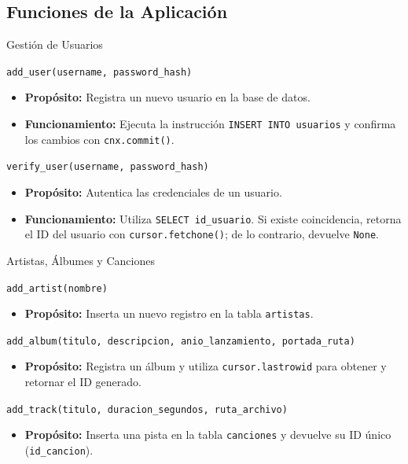 \documentclass[aspectratio=169, 10pt]{beamer}
\begin{document}
\subsection{Funciones de la Aplicación}

\begin{frame}[t]{Gestión de Usuarios}
	\small
	\begin{block}{\texttt{add\_user(username, password\_hash)}}
		\begin{itemize}
			\item \textbf{Propósito:} Registra un nuevo usuario en la base de datos.
			\item \textbf{Funcionamiento:} Ejecuta la instrucción \texttt{INSERT INTO usuarios} y confirma los cambios con \texttt{cnx.commit()}.
		\end{itemize}
	\end{block}
	
	\begin{block}{\texttt{verify\_user(username, password\_hash)}}
		\begin{itemize}
			\item \textbf{Propósito:} Autentica las credenciales de un usuario.
			\item \textbf{Funcionamiento:} Utiliza \texttt{SELECT id\_usuario}. Si existe coincidencia, retorna el ID del usuario con \texttt{cursor.fetchone()}; de lo contrario, devuelve \texttt{None}.
		\end{itemize}
	\end{block}
\end{frame}

\begin{frame}[t]{Artistas, Álbumes y Canciones}
	\small
	\begin{block}{\texttt{add\_artist(nombre)}}
		\begin{itemize}
			\item \textbf{Propósito:} Inserta un nuevo registro en la tabla \texttt{artistas}.
		\end{itemize}
	\end{block}
	
	\begin{block}{\texttt{add\_album(titulo, descripcion, anio\_lanzamiento, portada\_ruta)}}
		\begin{itemize}
			\item \textbf{Propósito:} Registra un álbum y utiliza \texttt{cursor.lastrowid} para obtener y retornar el ID generado.
		\end{itemize}
	\end{block}
	
	\begin{block}{\texttt{add\_track(titulo, duracion\_segundos, ruta\_archivo)}}
		\begin{itemize}
			\item \textbf{Propósito:} Inserta una pista en la tabla \texttt{canciones} y devuelve su ID único (\texttt{id\_cancion}).
		\end{itemize}
	\end{block}
\end{frame}
\end{document}
